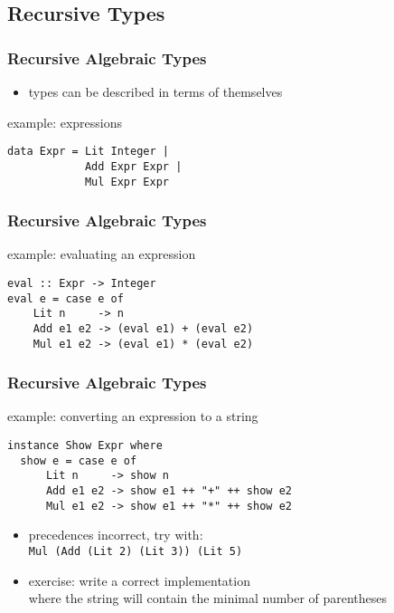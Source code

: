 \documentclass[dvipsnames]{beamer}
\theoremstyle{plain}
\begin{document}
\subsection{Recursive Types}

\begin{frame}[fragile]
  \frametitle{Recursive Algebraic Types}

  \begin{itemize}
    \item types can be described in terms of themselves
  \end{itemize}

  \begin{exampleblock}{example: expressions}
    \begin{lstlisting}
data Expr = Lit Integer |
            Add Expr Expr |
            Mul Expr Expr
    \end{lstlisting}
  \end{exampleblock}
\end{frame}

\begin{frame}[fragile]
  \frametitle{Recursive Algebraic Types}

  \begin{exampleblock}{example: evaluating an expression}
    \begin{lstlisting}
eval :: Expr -> Integer
eval e = case e of
    Lit n     -> n
    Add e1 e2 -> (eval e1) + (eval e2)
    Mul e1 e2 -> (eval e1) * (eval e2)
    \end{lstlisting}
  \end{exampleblock}
\end{frame}

\begin{frame}[fragile]
  \frametitle{Recursive Algebraic Types}

  \begin{exampleblock}{example: converting an expression to a string}
    \begin{lstlisting}
instance Show Expr where
  show e = case e of
      Lit n     -> show n
      Add e1 e2 -> show e1 ++ "+" ++ show e2
      Mul e1 e2 -> show e1 ++ "*" ++ show e2
    \end{lstlisting}
  \end{exampleblock}

  \pause
  \begin{itemize}
    \item precedences incorrect, try with:\\
      \lstinline|Mul (Add (Lit 2) (Lit 3)) (Lit 5)|
    \item exercise: write a correct implementation\\
      where the string will contain the minimal number of parentheses
  \end{itemize}
\end{frame}
\end{document}
